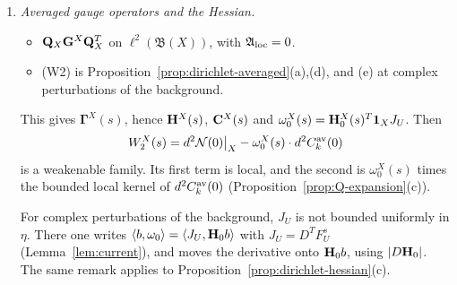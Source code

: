 \begin{enumerate}[label=(L\arabic*)]
\begin{itemize}
  \end{itemize}
  The result is $\bG^X(s)$, together with $D\bG^X(s)$, $\bG^X(s)D^T$ and $D\bG^X(s)D^T$.
\item \emph{Averaged gauge operators and the Hessian.}
  \begin{itemize}
  \item $\mathbf Q_X\mathbf G^X\mathbf Q_X^T$ on $\ell^2(\mathfrak B(X))$, with $\mathfrak A_{\rm loc}=0$.
  \item (W2) is Proposition~\ref{prop:dirichlet-averaged}(a),(d), and (e) at complex perturbations of the background.
  \end{itemize}
  This gives $\boldsymbol\Gamma^X(s)$, hence $\mathbf H^X(s)$, $\mathbf C^X(s)$ and $\omega_0^X(s)=\mathbf H_0^X(s)^T\mathbf 1_XJ_U$. Then
  \[
  W_2^X(s)=d^2\mathcal N(0)\big|_X-\omega_0^X(s)\cdot d^2C^{\rm av}_k(0)
  \]
  is a weakenable family. Its first term is local, and the second is $\omega_0^X(s)$ times the bounded local kernel of $d^2C^{\rm av}_k(0)$ (Proposition~\ref{prop:Q-expansion}(c)).

  For complex perturbations of the background, $J_U$ is not bounded uniformly in $\eta$. There one writes $\langle b,\omega_0\rangle=\langle J_U,\mathbf H_0b\rangle$ with $J_U=D^TF^s_U$ (Lemma~\ref{lem:current}), and moves the derivative onto $\mathbf H_0b$, using $|D\mathbf H_0|$. The same remark applies to Proposition~\ref{prop:dirichlet-hessian}(c).


\end{enumerate}
